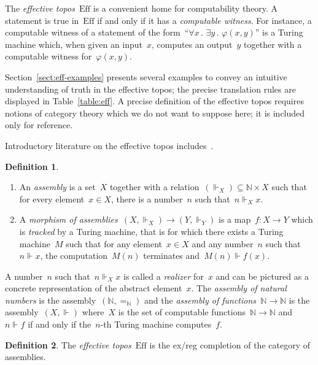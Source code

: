 \documentclass[oneside,reqno]{amsart}
\theoremstyle{definition}
\newtheorem{defn}{Definition}[section]
\theoremstyle{plain}
\theoremstyle{remark}
\newcommand{\NN}{\mathbb{N}}
\newcommand{\Eff}{\mathrm{Ef{}f}}
\renewcommand{\_}{\mathpunct{.}\,}
\newcommand{\effective}{ef{}fective\xspace}
\newcommand{\?}{\,{:}\,}
\newcommand{\realizes}{\Vdash}
\begin{document}
The \emph{\effective topos}~$\Eff$ is a convenient home for computability
theory. A statement is true in~$\Eff$ if and only if it has a \emph{computable
witness}. For instance, a computable witness of a statement of the
form~``$\forall x\_ \exists y\_ \varphi(x,y)$'' is a Turing machine which, when
given an input~$x$, computes an output~$y$ together with a computable witness
for~$\varphi(x,y)$.

Section~\ref{sect:eff-examples} presents several examples to convey an
intuitive understanding of truth in the \effective topos; the precise
translation rules are displayed in Table~\ref{table:eff}. A precise definition
of the \effective topos requires notions of category theory which we do not
want to suppose here; it is included only for reference.

Introductory literature on the \effective topos
includes~\cite{hyland:effective-topos,oosten:realizability,phoa:effective,bauer:c2c}.

\begin{defn}\begin{enumerate}
\item An \emph{assembly} is a set~$X$ together with a
relation~$({\realizes_X}) \subseteq \NN \times X$ such that for every element~$x
\in X$, there is a number~$n$ such that~$n \realizes_X x$.
\item A \emph{morphism of
assemblies}~$(X,{\realizes_X}) \to (Y,{\realizes_Y})$ is a map~$f : X \to Y$
which is \emph{tracked} by a Turing machine, that is for which there exists a
Turing machine~$M$ such that for any element~$x \in X$ and any number~$n$ such
that~$n \realizes x$, the computation~$M(n)$ terminates and~$M(n) \realizes
f(x)$.\end{enumerate}\end{defn}

A number~$n$ such that~$n \realizes_X x$ is called a \emph{realizer} for~$x$
and can be pictured as a concrete representation of the abstract element~$x$.
The \emph{assembly of natural numbers} is the assembly~$(\NN,{=_\NN})$ and the
\emph{assembly of functions~$\NN \to \NN$} is the
assembly~$(X,{\realizes})$ where~$X$ is the set of computable functions~$\NN
\to \NN$ and~$n \realizes f$ if and only if the~$n$-th Turing machine
computes~$f$.

\begin{defn}The \emph{\effective topos}~$\Eff$ is the ex/reg completion of the
category of assemblies.\end{defn}
\end{document}
